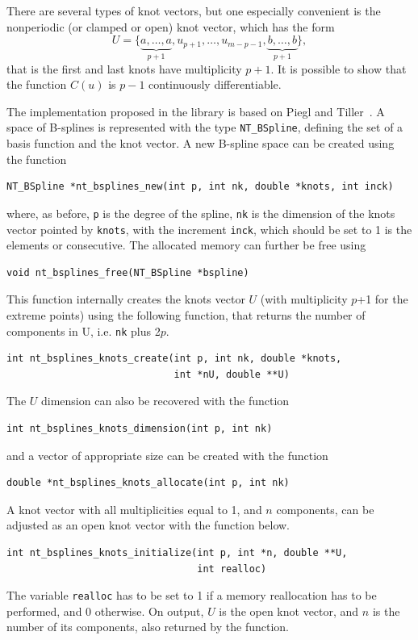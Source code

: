 There are several types of knot vectors, but one especially convenient
is the nonperiodic (or clamped or open) knot vector, which has the form 
\[
U = \lbrace \underbrace{a,\ldots,a}_{p+1}, u_{p+1}, \ldots, u_{m-p-1},
\underbrace{b,\ldots,b}_{p+1} \rbrace,
\]
that is the first and last knots have multiplicity $p+1$.
It is possible to show that the function $C(u)$ is $p-1$ continuously
differentiable.

The implementation proposed in the library is based on Piegl and
Tiller~\cite{PiegTill96}.
A space of B-splines is represented with the type \verb|NT_BSpline|, defining the set
of a basis function and the knot vector.
A new B-spline space can be created using the function
\begin{verbatim}
NT_BSpline *nt_bsplines_new(int p, int nk, double *knots, int inck)
\end{verbatim}
where, as before, \verb|p| is the degree of the spline, \verb|nk| is
the dimension of the knots vector pointed by \verb|knots|, with the
increment \verb|inck|, which should be set to 1 is the elements or
consecutive.
The allocated memory can further be free using
\begin{verbatim}
void nt_bsplines_free(NT_BSpline *bspline)
\end{verbatim}
This function internally creates the knots vector $U$ (with multiplicity $p$+1 for the extreme points)
using the following function, that returns the number of components in U, i.e. \verb|nk| plus 2$p$.
\begin{verbatim}
int nt_bsplines_knots_create(int p, int nk, double *knots,
                             int *nU, double **U)
\end{verbatim}
The $U$ dimension can also be recovered with the function
\begin{verbatim}
int nt_bsplines_knots_dimension(int p, int nk)
\end{verbatim}
and a vector of appropriate size can be created with the function
\begin{verbatim}
double *nt_bsplines_knots_allocate(int p, int nk)
\end{verbatim}
A knot vector with all multiplicities equal to 1, and $n$ components, can be adjusted as an open knot vector with the function below.
\begin{verbatim}
int nt_bsplines_knots_initialize(int p, int *n, double **U,
                                 int realloc)
\end{verbatim}
The variable \verb|realloc| has to be set to 1 if a memory reallocation has to be performed, and 0 otherwise. On output, $U$ is the open knot vector, and $n$ is the number of its components, also returned by the function.

